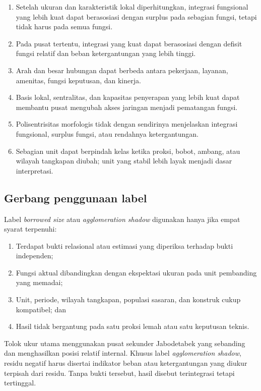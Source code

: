 \documentclass[11pt,a4paper,oneside,openany,indonesian]{report}
\begin{document}
\begin{enumerate}
  \item Setelah ukuran dan karakteristik lokal diperhitungkan, integrasi fungsional yang lebih kuat dapat berasosiasi dengan surplus pada sebagian fungsi, tetapi tidak harus pada semua fungsi.
  \item Pada pusat tertentu, integrasi yang kuat dapat berasosiasi dengan defisit fungsi relatif dan beban ketergantungan yang lebih tinggi.
  \item Arah dan besar hubungan dapat berbeda antara pekerjaan, layanan, amenitas, fungsi keputusan, dan kinerja.
  \item Basis lokal, sentralitas, dan kapasitas penyerapan yang lebih kuat dapat membantu pusat mengubah akses jaringan menjadi pematangan fungsi.
  \item Polisentrisitas morfologis tidak dengan sendirinya menjelaskan integrasi fungsional, surplus fungsi, atau rendahnya ketergantungan.
  \item Sebagian unit dapat berpindah kelas ketika proksi, bobot, ambang, atau wilayah tangkapan diubah; unit yang stabil lebih layak menjadi dasar interpretasi.
\end{enumerate}

\subsection{Gerbang penggunaan label}

Label \textit{borrowed size} atau \textit{agglomeration shadow} digunakan hanya jika empat syarat terpenuhi:

\begin{enumerate}
  \item Terdapat bukti relasional atau estimasi yang diperiksa terhadap bukti independen;
  \item Fungsi aktual dibandingkan dengan ekspektasi ukuran pada unit pembanding yang memadai;
  \item Unit, periode, wilayah tangkapan, populasi sasaran, dan konstruk cukup kompatibel; dan
  \item Hasil tidak bergantung pada satu proksi lemah atau satu keputusan teknis.
\end{enumerate}

Tolok ukur utama menggunakan pusat sekunder Jabodetabek yang sebanding
dan menghasilkan posisi relatif internal. Khusus label
\textit{agglomeration shadow}, residu negatif harus disertai indikator
beban atau ketergantungan yang diukur terpisah dari residu. Tanpa bukti
tersebut, hasil disebut terintegrasi tetapi tertinggal.
\end{document}
